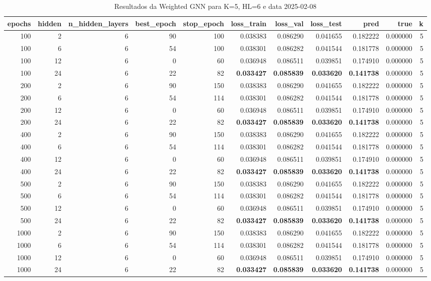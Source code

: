 \begin{table}
\caption{Resultados da Weighted GNN para K=5, HL=6 e data 2025-02-08}
\label{tab:weighted_gnn_results_k5_hl6_d20250208}
\begin{tabular}{rrrrrrrrrrr}
\toprule
epochs & hidden & n\_hidden\_layers & best\_epoch & stop\_epoch & loss\_train & loss\_val & loss\_test & pred & true & k \\
\midrule
100 & 2 & 6 & 90 & 100 & 0.038383 & 0.086290 & 0.041655 & 0.182222 & 0.000000 & 5 \\
100 & 6 & 6 & 54 & 100 & 0.038301 & 0.086282 & 0.041544 & 0.181778 & 0.000000 & 5 \\
100 & 12 & 6 & 0 & 60 & 0.036948 & 0.086511 & 0.039851 & 0.174910 & 0.000000 & 5 \\
100 & 24 & 6 & 22 & 82 & \textbf{0.033427} & \textbf{0.085839} & \textbf{0.033620} & \textbf{0.141738} & 0.000000 & 5 \\
200 & 2 & 6 & 90 & 150 & 0.038383 & 0.086290 & 0.041655 & 0.182222 & 0.000000 & 5 \\
200 & 6 & 6 & 54 & 114 & 0.038301 & 0.086282 & 0.041544 & 0.181778 & 0.000000 & 5 \\
200 & 12 & 6 & 0 & 60 & 0.036948 & 0.086511 & 0.039851 & 0.174910 & 0.000000 & 5 \\
200 & 24 & 6 & 22 & 82 & \textbf{0.033427} & \textbf{0.085839} & \textbf{0.033620} & \textbf{0.141738} & 0.000000 & 5 \\
400 & 2 & 6 & 90 & 150 & 0.038383 & 0.086290 & 0.041655 & 0.182222 & 0.000000 & 5 \\
400 & 6 & 6 & 54 & 114 & 0.038301 & 0.086282 & 0.041544 & 0.181778 & 0.000000 & 5 \\
400 & 12 & 6 & 0 & 60 & 0.036948 & 0.086511 & 0.039851 & 0.174910 & 0.000000 & 5 \\
400 & 24 & 6 & 22 & 82 & \textbf{0.033427} & \textbf{0.085839} & \textbf{0.033620} & \textbf{0.141738} & 0.000000 & 5 \\
500 & 2 & 6 & 90 & 150 & 0.038383 & 0.086290 & 0.041655 & 0.182222 & 0.000000 & 5 \\
500 & 6 & 6 & 54 & 114 & 0.038301 & 0.086282 & 0.041544 & 0.181778 & 0.000000 & 5 \\
500 & 12 & 6 & 0 & 60 & 0.036948 & 0.086511 & 0.039851 & 0.174910 & 0.000000 & 5 \\
500 & 24 & 6 & 22 & 82 & \textbf{0.033427} & \textbf{0.085839} & \textbf{0.033620} & \textbf{0.141738} & 0.000000 & 5 \\
1000 & 2 & 6 & 90 & 150 & 0.038383 & 0.086290 & 0.041655 & 0.182222 & 0.000000 & 5 \\
1000 & 6 & 6 & 54 & 114 & 0.038301 & 0.086282 & 0.041544 & 0.181778 & 0.000000 & 5 \\
1000 & 12 & 6 & 0 & 60 & 0.036948 & 0.086511 & 0.039851 & 0.174910 & 0.000000 & 5 \\
1000 & 24 & 6 & 22 & 82 & \textbf{0.033427} & \textbf{0.085839} & \textbf{0.033620} & \textbf{0.141738} & 0.000000 & 5 \\
\bottomrule
\end{tabular}
\end{table}

